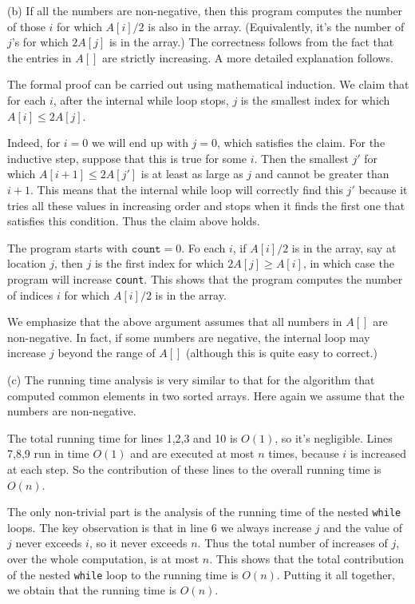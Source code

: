 \documentclass[11pt]{article}
\begin{document}
\begin{solution}
(b) If all the numbers are non-negative, then
this program computes the number of those $i$ for which
$A[i]/2$ is also in the array. (Equivalently, it's the number of
$j$'s for which $2A[j]$ is in the array.)
The correctness follows from the fact that 
the entries in $A[]$ are strictly increasing. A more
detailed explanation follows.

The formal proof can be carried out using mathematical induction. 
We claim that for each $i$, after the internal while loop stops, $j$
is the smallest index for which $A[i] \le 2A[j]$.

Indeed, for $i=0$ we will end up with $j=0$, which
satisfies the claim. For the inductive step,
suppose that this is true for some $i$.
Then the smallest $j'$ for which $A[i+1] \le 2A[j']$
is at least as large as $j$ and cannot be greater
than $i+1$. This means that the internal while loop will
correctly find this $j'$ because it tries all these
values in increasing order and stops when it finds the
first one that satisfies this condition. Thus the claim above
holds.

The program starts with $\texttt{count} = 0$. 
Fo each $i$, if $A[i]/2$ is in the array, say at location $j$, then $j$
is the first index for which $2A[j]\ge A[i]$, in which case
the program will increase \texttt{count}. This shows that the
program computes the number of indices $i$ for which 
$A[i]/2$ is in the array.

We emphasize that the above argument assumes that all numbers in $A[]$ are
non-negative. In fact, if some numbers are negative, the internal
loop may increase $j$ beyond the range of $A[]$ (although this
is quite easy to correct.)

\medskip
\noindent
(c) The running time analysis is very similar to that for the 
algorithm that computed common elements in two sorted arrays.
Here again we assume that the numbers are non-negative.

The total running time for lines 1,2,3 and 10 is $O(1)$, so it's
negligible. Lines 7,8,9 run in time $O(1)$ and are executed
at most $n$ times, because $i$ is increased at each step. So
the contribution of these lines to the overall running time is
$O(n)$.

The only non-trivial part is the analysis of the running time
of the nested \texttt{while} loops. The key observation is that
in line 6 we always increase $j$ and the value of $j$ never
exceeds $i$, so it never exceeds $n$. Thus the total number of
increases of $j$, over the whole computation, is at most $n$.
This shows that the total contribution of the nested
\texttt{while} loop to the running time is $O(n)$. Putting it
all together, we obtain that the running time is $O(n)$.
\end{solution}
\end{document}
